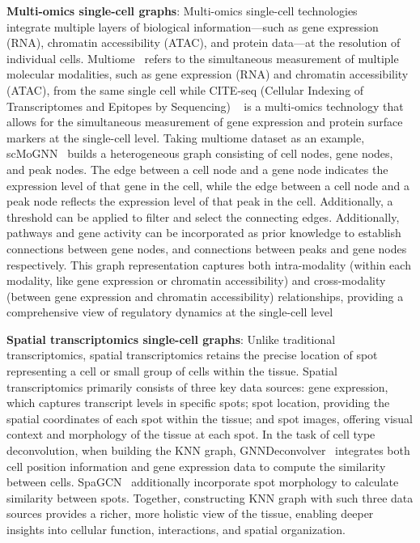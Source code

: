 \textbf{Multi-omics single-cell graphs}:
Multi-omics single-cell technologies ~\cite{baysoy2023technological} integrate multiple layers of biological information—such as gene expression (RNA), chromatin accessibility (ATAC), and protein data—at the resolution of individual cells. Multiome~\cite{stuart2019integrative} refers to the simultaneous measurement of multiple molecular modalities, such as gene expression (RNA) and chromatin accessibility (ATAC), from the same single cell while CITE-seq (Cellular Indexing of Transcriptomes and Epitopes by Sequencing) ~\cite{mimitou2019multiplexed} is a multi-omics technology that allows for the simultaneous measurement of gene expression and protein surface markers at the single-cell level. 
Taking multiome dataset as an example, scMoGNN~\cite{wen2022graph} builds a heterogeneous graph consisting of cell nodes, gene nodes, and peak nodes. The edge between a cell node and a gene node indicates the expression level of that gene in the cell, while the edge between a cell node and a peak node reflects the expression level of that peak in the cell. Additionally, a threshold can be applied to filter and select the connecting edges. 
Additionally, pathways and gene activity can be incorporated as prior knowledge to establish connections between gene nodes, and connections between peaks and gene nodes respectively.
This graph representation captures both intra-modality (within each modality, like gene expression or chromatin accessibility) and cross-modality (between gene expression and chromatin accessibility) relationships, providing a comprehensive view of regulatory dynamics at the single-cell level

\textbf{Spatial transcriptomics single-cell graphs}: 
Unlike traditional transcriptomics, spatial transcriptomics retains the precise location of spot representing a cell or small group of cells within the tissue. 
Spatial transcriptomics primarily consists of three key data sources: gene expression, which captures transcript levels in specific spots; spot location, providing the spatial coordinates of each spot within the tissue; and spot images, offering visual context and morphology of the tissue at each spot.
In the task of cell type deconvolution, when building the KNN graph, GNNDeconvolver~\cite{ding2024spatialctd} integrates both cell position information and gene expression data to compute the similarity between cells. SpaGCN~\cite{hu2021spagcn} additionally incorporate spot morphology to calculate similarity between spots.
Together, constructing KNN graph with such three data sources provides a richer, more holistic view of the tissue, enabling deeper insights into cellular function, interactions, and spatial organization.



